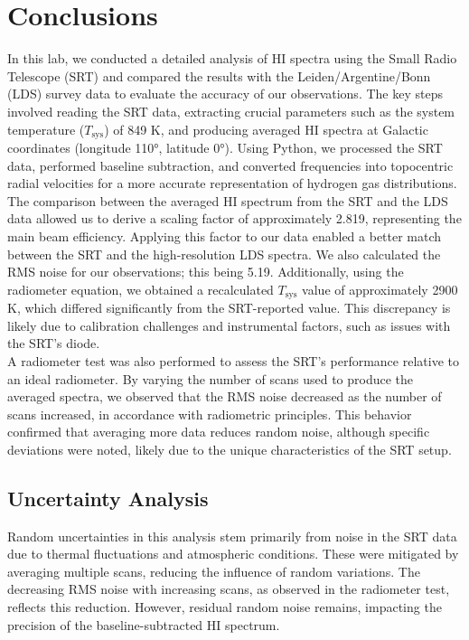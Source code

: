 \documentclass[linenumbers,twocolumn]{aastex631}
\begin{document}
\section{Conclusions}

In this lab, we conducted a detailed analysis of HI spectra using the Small Radio Telescope (SRT) and compared the results with the Leiden/Argentine/Bonn (LDS) survey data to evaluate the accuracy of our observations. The key steps involved reading the SRT data, extracting crucial parameters such as the system temperature ($T_{\text{sys}}$) of 849 K, and producing averaged HI spectra at Galactic coordinates (longitude 110°, latitude 0°). Using Python, we processed the SRT data, performed baseline subtraction, and converted frequencies into topocentric radial velocities for a more accurate representation of hydrogen gas distributions. \\

The comparison between the averaged HI spectrum from the SRT and the LDS data allowed us to derive a scaling factor of approximately 2.819, representing the main beam efficiency. Applying this factor to our data enabled a better match between the SRT and the high-resolution LDS spectra. We also calculated the RMS noise for our observations; this being 5.19. Additionally, using the radiometer equation, we obtained a recalculated $T_{\text{sys}}$ value of approximately 2900 K, which differed significantly from the SRT-reported value. This discrepancy is likely due to calibration challenges and instrumental factors, such as issues with the SRT’s diode. \\

A radiometer test was also performed to assess the SRT’s performance relative to an ideal radiometer. By varying the number of scans used to produce the averaged spectra, we observed that the RMS noise decreased as the number of scans increased, in accordance with radiometric principles. This behavior confirmed that averaging more data reduces random noise, although specific deviations were noted, likely due to the unique characteristics of the SRT setup.

\subsection{Uncertainty Analysis}

Random uncertainties in this analysis stem primarily from noise in the SRT data due to thermal fluctuations and atmospheric conditions. These were mitigated by averaging multiple scans, reducing the influence of random variations. The decreasing RMS noise with increasing scans, as observed in the radiometer test, reflects this reduction. However, residual random noise remains, impacting the precision of the baseline-subtracted HI spectrum. \\
\end{document}
